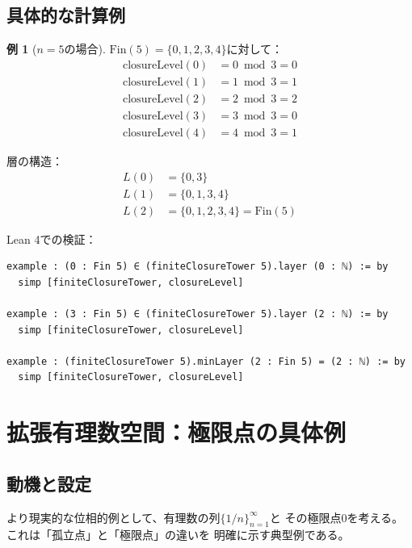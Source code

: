 \documentclass[a4paper,12pt]{ltjsarticle}
\theoremstyle{definition}
\newtheorem{example}[definition]{例}
\begin{document}
\subsection{具体的な計算例}

\begin{example}[$n=5$の場合]
$\mathrm{Fin}(5) = \{0, 1, 2, 3, 4\}$に対して：
\begin{align*}
\mathrm{closureLevel}(0) &= 0 \bmod 3 = 0 \\
\mathrm{closureLevel}(1) &= 1 \bmod 3 = 1 \\
\mathrm{closureLevel}(2) &= 2 \bmod 3 = 2 \\
\mathrm{closureLevel}(3) &= 3 \bmod 3 = 0 \\
\mathrm{closureLevel}(4) &= 4 \bmod 3 = 1
\end{align*}

層の構造：
\begin{align*}
L(0) &= \{0, 3\} \\
L(1) &= \{0, 1, 3, 4\} \\
L(2) &= \{0, 1, 2, 3, 4\} = \mathrm{Fin}(5)
\end{align*}
\end{example}

Lean 4での検証：

\begin{lstlisting}[language=Lean]
example : (0 : Fin 5) ∈ (finiteClosureTower 5).layer (0 : ℕ) := by
  simp [finiteClosureTower, closureLevel]

example : (3 : Fin 5) ∈ (finiteClosureTower 5).layer (2 : ℕ) := by
  simp [finiteClosureTower, closureLevel]

example : (finiteClosureTower 5).minLayer (2 : Fin 5) = (2 : ℕ) := by
  simp [finiteClosureTower, closureLevel]
\end{lstlisting}

\section{拡張有理数空間：極限点の具体例}

\subsection{動機と設定}

より現実的な位相的例として、有理数の列$\{1/n\}_{n=1}^{\infty}$と
その極限点$0$を考える。これは「孤立点」と「極限点」の違いを
明確に示す典型例である。
\end{document}
